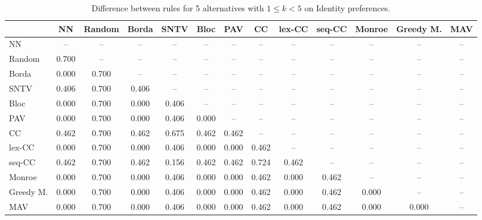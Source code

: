 
\begin{table*}[htbp]
\centering
\begin{tabular}{lcccccccccccc}
\toprule
 & NN & Random & Borda & SNTV & Bloc & PAV & CC & lex-CC & seq-CC & Monroe & Greedy M. & MAV \\
\midrule
NN & -- & -- & -- & -- & -- & -- & -- & -- & -- & -- & -- & -- \\
Random & \cellcolor{blue!70} 0.700 & -- & -- & -- & -- & -- & -- & -- & -- & -- & -- & -- \\
Borda & \cellcolor{blue!0} 0.000 & \cellcolor{blue!70} 0.700 & -- & -- & -- & -- & -- & -- & -- & -- & -- & -- \\
SNTV & \cellcolor{blue!40} 0.406 & \cellcolor{blue!70} 0.700 & \cellcolor{blue!40} 0.406 & -- & -- & -- & -- & -- & -- & -- & -- & -- \\
Bloc & \cellcolor{blue!0} 0.000 & \cellcolor{blue!70} 0.700 & \cellcolor{blue!0} 0.000 & \cellcolor{blue!40} 0.406 & -- & -- & -- & -- & -- & -- & -- & -- \\
PAV & \cellcolor{blue!0} 0.000 & \cellcolor{blue!70} 0.700 & \cellcolor{blue!0} 0.000 & \cellcolor{blue!40} 0.406 & \cellcolor{blue!0} 0.000 & -- & -- & -- & -- & -- & -- & -- \\
CC & \cellcolor{blue!46} 0.462 & \cellcolor{blue!70} 0.700 & \cellcolor{blue!46} 0.462 & \cellcolor{blue!67} 0.675 & \cellcolor{blue!46} 0.462 & \cellcolor{blue!46} 0.462 & -- & -- & -- & -- & -- & -- \\
lex-CC & \cellcolor{blue!0} 0.000 & \cellcolor{blue!70} 0.700 & \cellcolor{blue!0} 0.000 & \cellcolor{blue!40} 0.406 & \cellcolor{blue!0} 0.000 & \cellcolor{blue!0} 0.000 & \cellcolor{blue!46} 0.462 & -- & -- & -- & -- & -- \\
seq-CC & \cellcolor{blue!46} 0.462 & \cellcolor{blue!70} 0.700 & \cellcolor{blue!46} 0.462 & \cellcolor{blue!15} 0.156 & \cellcolor{blue!46} 0.462 & \cellcolor{blue!46} 0.462 & \cellcolor{blue!72} 0.724 & \cellcolor{blue!46} 0.462 & -- & -- & -- & -- \\
Monroe & \cellcolor{blue!0} 0.000 & \cellcolor{blue!70} 0.700 & \cellcolor{blue!0} 0.000 & \cellcolor{blue!40} 0.406 & \cellcolor{blue!0} 0.000 & \cellcolor{blue!0} 0.000 & \cellcolor{blue!46} 0.462 & \cellcolor{blue!0} 0.000 & \cellcolor{blue!46} 0.462 & -- & -- & -- \\
Greedy M. & \cellcolor{blue!0} 0.000 & \cellcolor{blue!70} 0.700 & \cellcolor{blue!0} 0.000 & \cellcolor{blue!40} 0.406 & \cellcolor{blue!0} 0.000 & \cellcolor{blue!0} 0.000 & \cellcolor{blue!46} 0.462 & \cellcolor{blue!0} 0.000 & \cellcolor{blue!46} 0.462 & \cellcolor{blue!0} 0.000 & -- & -- \\
MAV & \cellcolor{blue!0} 0.000 & \cellcolor{blue!70} 0.700 & \cellcolor{blue!0} 0.000 & \cellcolor{blue!40} 0.406 & \cellcolor{blue!0} 0.000 & \cellcolor{blue!0} 0.000 & \cellcolor{blue!46} 0.462 & \cellcolor{blue!0} 0.000 & \cellcolor{blue!46} 0.462 & \cellcolor{blue!0} 0.000 & \cellcolor{blue!0} 0.000 & -- \\
\bottomrule
\end{tabular}

\caption{Difference between rules for 5 alternatives with $1 \leq k < 5$ on Identity preferences.}
\label{tab:rule_distance_heatmap-m=[5]-pref_dist=identity}
\end{table*}
    